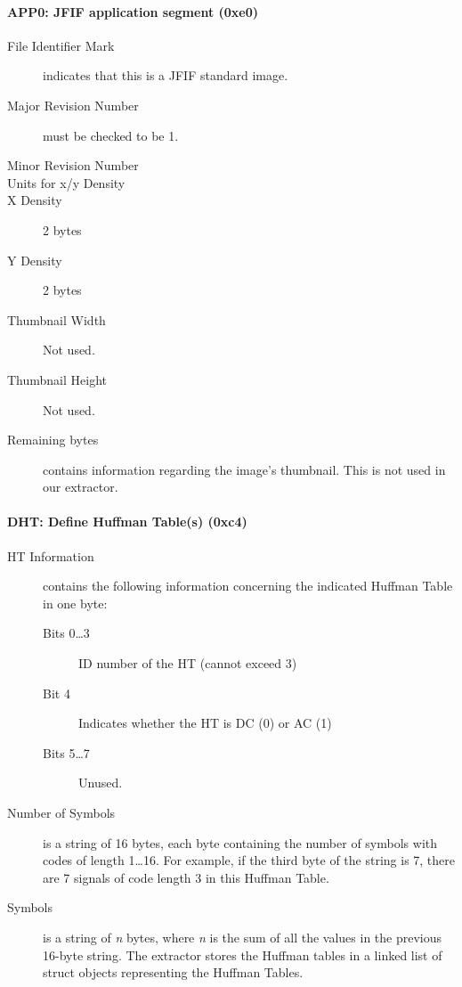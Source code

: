 \paragraph*{APP0: JFIF application segment (0xe0)}
\begin{description}
	\item[File Identifier Mark] indicates that this is a JFIF standard image.
	\item[Major Revision Number] must be checked to be 1.
	\item[Minor Revision Number] 
	\item[Units for x/y Density] 
	\item[X Density]2 bytes
	\item[Y Density]2 bytes
	\item[Thumbnail Width] Not used.
	\item[Thumbnail Height] Not used.
	\item[Remaining bytes] contains information regarding the image's thumbnail. This is not used in our extractor.
\end{description}

\paragraph*{DHT: Define Huffman Table(s) (0xc4)}
\begin{description}
	\item[HT Information] contains the following information concerning the indicated Huffman Table in one byte:
		\begin{description}
			\item[Bits 0\ldots3] ID number of the HT (cannot exceed 3)
			\item[Bit 4] Indicates whether the HT is DC (0) or AC (1)
			\item[Bits 5\ldots7] Unused.
		\end{description}
	\item[Number of Symbols] is a string of 16 bytes, each byte containing the number of symbols with
		 codes of length 1\ldots16. For example, if the third byte of the string is 7, 
		there are 7 signals of code length 3 in this Huffman Table.
	\item[Symbols] is a string of \emph{n} bytes, where \emph{n} is 
		the sum of all the values in the previous 16-byte string. 
		The extractor stores the Huffman tables in a linked list of struct objects representing the Huffman Tables.
\end{description}

